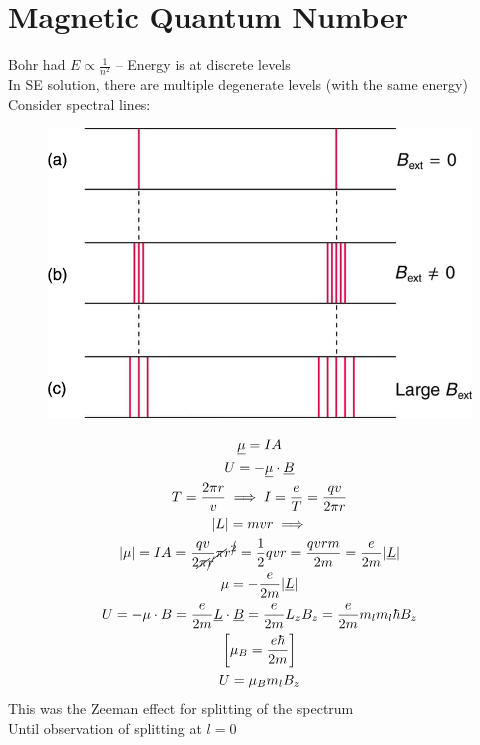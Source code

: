 \documentclass[a4paper, 11pt, fleqn, normalem]{report}
\begin{document}
\section{Magnetic Quantum Number}
Bohr had $E \propto \frac{1}{n^{2}}$ -- Energy is at discrete levels \\
In SE solution, there are multiple degenerate levels (with the same energy) \\
Consider spectral lines:
\begin{figure}[H]
    \includegraphics{MLS.jpg}
\end{figure}
\begin{gather*}
    \underline{\mu} = IA \\
    U = -\underline{\mu}\cdot\underline{B} \\
    T = \frac{2\pi r}{v} \implies I = \frac{e}{T} = \frac{qv}{2\pi r} \\
    |L| = mvr \implies \\
    |\mu| = IA = \frac{qv}{2\cancel{\pi}\cancel{r}}\cancel{\pi}r^{\cancel{2}} = \frac{1}{2}qvr = \frac{qvrm}{2m} = \frac{e}{2m}|\underline{L}| \\
    \mu = -\frac{e}{2m}|\underline{L}| \\
    U = -\mu \cdot B = \frac{e}{2m}\underline{L} \cdot \underline{B} = \frac{e}{2m}L_{z}B_{z} = \frac{e}{2m}m_{l}m_{l}\hbar B_{z} \\
    \bigg[\mu_{B} = \frac{e\hbar}{2m}\bigg] \\
    U = \mu_{B}m_{l}B_{z}
\end{gather*}
This was the Zeeman effect for splitting of the spectrum \\
Until observation of splitting at $l = 0$ \\
\end{document}

